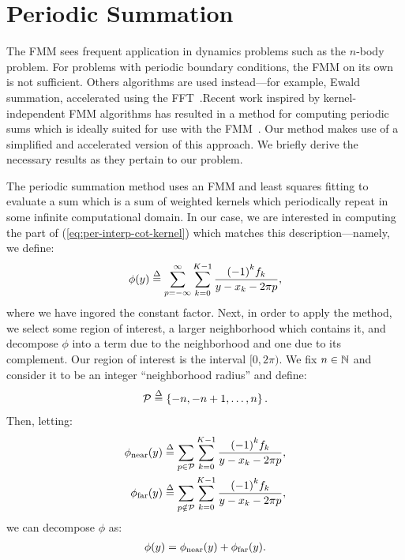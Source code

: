 \section{Periodic Summation}

The FMM sees frequent application in dynamics problems such as the
$n$-body problem. For problems with periodic boundary conditions, the
FMM on its own is not sufficient. Others algorithms are used
instead---for example, Ewald summation, accelerated using the
FFT~\cite{ewald}.\@ Recent work inspired by kernel-independent FMM
algorithms has resulted in a method for computing periodic sums which
is ideally suited for use with the FMM~\cite{periodic-sums}. Our
method makes use of a simplified and accelerated version of this
approach. We briefly derive the necessary results as they pertain to
our problem.

The periodic summation method uses an FMM and least squares fitting to
evaluate a sum which is a sum of weighted kernels which periodically
repeat in some infinite computational domain. In our case, we are
interested in computing the part of (\ref{eq:per-interp-cot-kernel})
which matches this description---namely, we define:
\begin{align}
  \label{eq:phi}
  \phi(y{}) \overset{\Delta}{=} \sum_{p{}=-\infty}^\infty \sum_{{k{}}=0}^{K{}-1} \frac{{(-1)}^{k{}}{f}_{k{}}}{y{} - {x}_{k{}} - 2\pi{}p{}},
\end{align}
where we have ingored the constant factor. Next, in order to apply the
method, we select some region of interest, a larger neighborhood which
contains it, and decompose $\phi$ into a term due to the neighborhood
and one due to its complement. Our region of interest is the interval
$[0, 2\pi)$. We fix $n\in\mathbb{N}$ and consider it to be
an integer ``neighborhood radius'' and define:
\begin{align}
  \label{eq:neighborhood}
  \mathcal{P} \overset{\Delta}{=} \left\{-n, -n+1, \hdots, n\right\}.
\end{align}
Then, letting:
\begin{align}
  \phi_{\operatorname{near}}(y) &\overset{\Delta}{=} \sum_{p\in\mathcal{P}}\sum_{{k{}}=0}^{K{}-1} \frac{{(-1)}^k{f}_{k}}{y-{x}_{k}-2\pi p}, \label{eq:phinear} \\
  \phi_{\operatorname{far}}(y) &\overset{\Delta}{=} \sum_{p\notin\mathcal{P}}\sum_{{k{}}=0}^{K{}-1} \frac{{(-1)}^k{f}_{k}}{y-{x}_{k}-2\pi p}, \label{eq:phifar}
\end{align}
we can decompose $\phi$ as:
\begin{align}
  \label{eq:phinear-plus-phifar}
  \phi(y) = \phi_{\operatorname{near}}(y) + \phi_{\operatorname{far}}(y).
\end{align}

